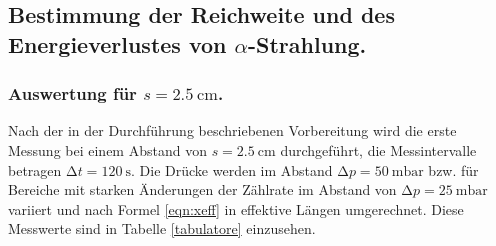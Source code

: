 
\subsection{\texorpdfstring{Bestimmung der Reichweite und des Energieverlustes von $\alpha$-Strahlung}{Bestimmung der Reichweite und des Energieverlustes von Alpha-Strahlung}.}

\subsubsection{\texorpdfstring{Auswertung für $s=\SI{2.5}{\centi\metre}$}{Auswertung für s = 2.5 cm}.}

Nach der in der Durchführung beschriebenen Vorbereitung wird die erste Messung bei einem Abstand von $s = \SI{2.5}{\centi\metre}$ durchgeführt, die Messintervalle betragen $\increment t = \SI{120}{\second}$.
Die Drücke werden im Abstand $\increment p = \SI{50}{\milli\bar}$ bzw. für Bereiche mit starken Änderungen der Zählrate im Abstand von $\increment p = \SI{25}{\milli\bar}$ variiert und nach Formel \eqref{eqn:xeff} in effektive Längen umgerechnet.
Diese Messwerte sind in Tabelle \ref{tabulatore} einzusehen.

%


